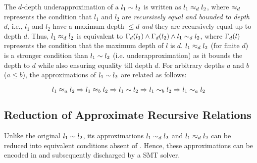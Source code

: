 The $d$-depth underapproximation of a \recursiveRelation{} $l_1 \sim{} l_2$
is written as $l_1 \approx_{d} l_2$, where $\approx_{d}$ represents
the condition that $l_1$ and $l_2$ are {\em recursively equal and bounded to depth $d$},
i.e., $l_1$ and $l_2$ have a maximum depth $\leq d$ {\em and}
they are recursively equal up to depth $d$.
Thus, $l_1 \approx_{d} l_2$ is equivalent to
$\Gamma_{d}(l_1) \land \Gamma_{d}(l_2) \land l_1 \sim_{d} l_2$,
where $\Gamma_{d}(l)$ represents the condition that the maximum
depth of $l$ is $d$.
$l_1 \approx_{d} l_2$ (for finite $d$) is a stronger condition than
$l_1\sim{}l_2$ (i.e. underapproximation)
as it bounds the depth to $d$ while also ensuring equality till depth $d$.
For arbitrary depths $a$ and $b$ ($a \leq b$),
the approximations of $l_1 \sim{} l_2$ are related as follows:

\begin{equation}
\label{eqn:approxrels}
l_1 \approx_{a} l_2 \Rightarrow l_1 \approx_{b} l_2 \Rightarrow l_1 \sim{} l_2 \Rightarrow l_1 \sim_{b} l_2 \Rightarrow l_1 \sim_{a} l_2
\end{equation}

\subsection{Reduction of Approximate Recursive Relations}
\label{sec:approxdecomp}
Unlike the original \recursiveRelation{} $l_1 \sim{} l_2$,
its approximations $l_1\sim_{d}l_2$ and $l_1\approx_{d}l_2$ can be reduced into
equivalent conditions absent of \recursiveRelations{}.
Hence, these approximations can be encoded in and subsequently discharged by a SMT solver.

